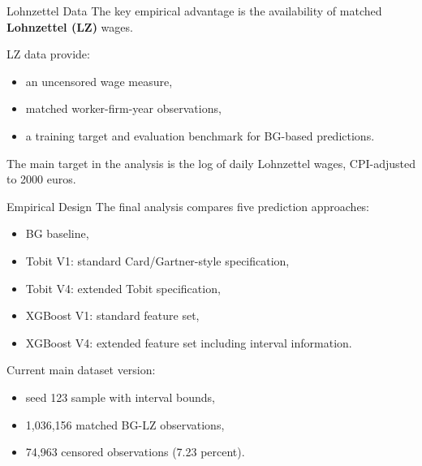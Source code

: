 \documentclass[10pt]{beamer}
\begin{document}
\begin{frame}{Lohnzettel Data}
The key empirical advantage is the availability of matched \textbf{Lohnzettel (LZ)} wages.

\vspace{0.3cm}
LZ data provide:
\begin{itemize}
    \item an uncensored wage measure,
    \item matched worker-firm-year observations,
    \item a training target and evaluation benchmark for BG-based predictions.
\end{itemize}

\vspace{0.3cm}
The main target in the analysis is the log of daily Lohnzettel wages, CPI-adjusted to 2000 euros.
\end{frame}

\begin{frame}{Empirical Design}
The final analysis compares five prediction approaches:

\vspace{0.2cm}
\begin{itemize}
    \item BG baseline,
    \item Tobit V1: standard Card/Gartner-style specification,
    \item Tobit V4: extended Tobit specification,
    \item XGBoost V1: standard feature set,
    \item XGBoost V4: extended feature set including interval information.
\end{itemize}

\vspace{0.3cm}
Current main dataset version:
\begin{itemize}
    \item seed 123 sample with interval bounds,
    \item 1,036,156 matched BG-LZ observations,
    \item 74,963 censored observations (7.23 percent).
\end{itemize}
\end{frame}
\end{document}
